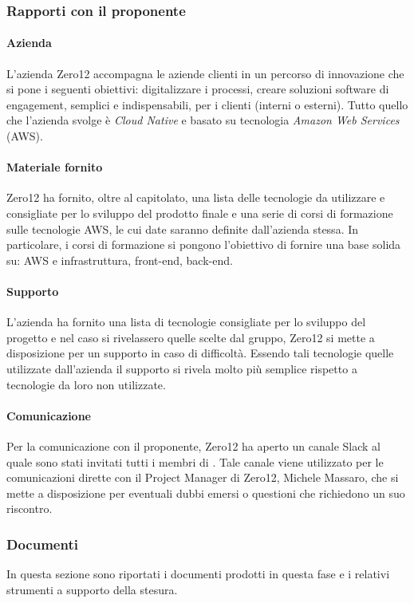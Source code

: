 \subsubsection{Rapporti con il proponente}
\paragraph{Azienda}
L’azienda Zero12 accompagna le aziende clienti in un percorso di innovazione che si pone i
seguenti obiettivi: digitalizzare i processi, creare soluzioni software di engagement, semplici e indispensabili, per i clienti (interni o esterni). Tutto quello che l’azienda svolge è \textit{Cloud Native}\glo{} e basato su tecnologia \textit{Amazon Web Services}\glo{} (AWS).

\paragraph{Materiale fornito}
Zero12 ha fornito, oltre al capitolato, una lista delle tecnologie da utilizzare e consigliate per lo
sviluppo del prodotto finale e una serie di corsi di formazione sulle tecnologie AWS, le cui date
saranno definite dall’azienda stessa. In particolare, i corsi di formazione si pongono l'obiettivo di fornire una base solida su: AWS e infrastruttura, front-end\glo{}, back-end\glo{}.

\paragraph{Supporto}
L’azienda ha fornito una lista di tecnologie consigliate per lo sviluppo del progetto e nel caso si
rivelassero quelle scelte dal gruppo, Zero12 si mette a disposizione per un supporto in caso di
difficoltà. Essendo tali tecnologie quelle utilizzate dall’azienda il supporto si rivela molto più
semplice rispetto a tecnologie da loro non utilizzate.

\paragraph{Comunicazione}
Per la comunicazione con il proponente, Zero12 ha aperto un canale Slack\glo{} al quale sono stati
invitati tutti i membri di \groupName{}. Tale canale viene utilizzato per le comunicazioni dirette
con il Project Manager di Zero12, Michele Massaro, che si mette a disposizione per eventuali
dubbi emersi o questioni che richiedono un suo riscontro.

\subsubsection{Documenti}
In questa sezione sono riportati i documenti prodotti in questa fase e i relativi strumenti a supporto della stesura.

